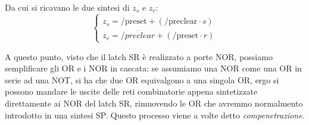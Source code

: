 \documentclass[a4paper,11pt]{article}
\begin{document}
Da cui si ricavano le due sintesi di $z_s$ e $z_r$:
\[
	\begin{cases}
		z_s = \overline{\mathrm{/preset}} + (\mathrm{/preclear} \cdot s) \\ 
		z_r = \overline{\mathrm/preclear} + (\mathrm{/preset} \cdot r)
	\end{cases}
\]

A questo punto, visto che il latch SR è realizzato a porte NOR, possiamo semplificare gli OR e i NOR in cascata: se assumiamo una NOR come una OR in serie ad una NOT, si ha che due OR equivalgono a una singola OR, ergo si possono mandare le uscite delle reti combinatorie appena sintetizzate direttamente ai NOR del latch SR, rimuovendo le OR che avremmo normalmento introdotto in una sintesi SP. 
Questo processo viene a volte detto \textit{compenetrazione}.
\end{document}
